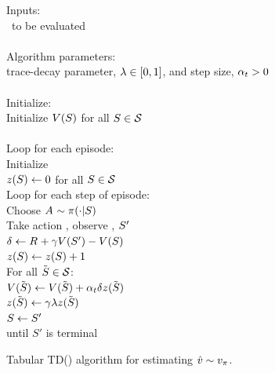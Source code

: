\begin{table}
\beginalg
Inputs:\\
\> \pol\ to be evaluated\\
\\
Algorithm parameters:\\
\> trace-decay parameter, $\lambda \in [0,1]$, and step size, $\alpha_{t}>0$\\
\\
Initialize:
\\
\> Initialize $V(S_{})$ for all $S_{}\in\mathcal{S}$\\
\\
Loop for each episode:\\
\> Initialize \state{}\\
\> $z_{}({S_{}}) \leftarrow 0$ for all ${S_{}}\in\mathcal{S}$\\
\> Loop for each step of episode:
\\
\> \> Choose $A_{} \sim \pi(\cdot|S_{})$\\
\> \> Take action \action, observe \reward{}, $S_{}'$\\
\> \> $\delta_{} \leftarrow R_{} + \gamma V(S_{}') - V (S_{})$\\
\> \> $z_{}(S_{}) \leftarrow z_{}(S_{}) + 1$\\
\> \> For all $\tilde{S_{}} \in \mathcal{S}$:\\
\> \> \> $V(\tilde{S_{}}) \leftarrow V(\tilde{S_{}}) + \alpha_{t} \delta_{} z_{}(\tilde{S_{}})$\\
\> \> \> $z_{}(\tilde{S_{}}) \leftarrow \gamma \lambda z_{}(\tilde{S_{}})$\\
\> \> $S_{} \leftarrow S_{}'$
\\
\> until $S'$ is terminal
\endalg
\caption{Tabular TD(\tdparam) algorithm for estimating $\hat{v} \sim v_{\pi}$.}
\label{tab:alg:et:tabular-td}
\end{table}


